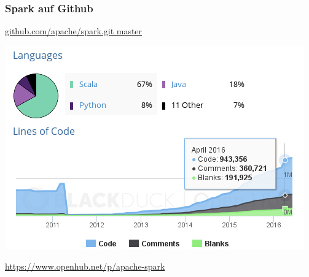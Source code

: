 \begin{frame}
\end{frame}


\begin{frame}
    \frametitle{Spark auf Github}
    \centerline{\url{github.com/apache/spark.git master}}
    \centerline{\includegraphics[width=0.9\linewidth]{spark-openhub.png}}
    \centerline{\textcolor{gray}{\scriptsize{\url{
        https://www.openhub.net/p/apache-spark
    }}}}
\end{frame}


